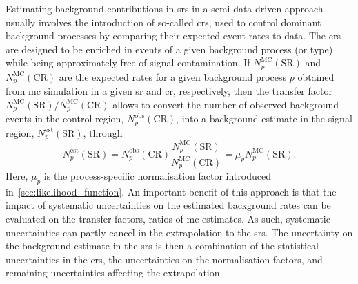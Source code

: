 Estimating background contributions in \glspl{sr} in a semi-data-driven approach usually involves the introduction of so-called \glspl{cr}, used to control dominant background processes by comparing their expected event rates to data.
The \glspl{cr} are designed to be enriched in events of a given background process (or type) while being approximately free of signal contamination.
If $N_p^\mathrm{MC}(\mathrm{SR})$ and $N_p^\mathrm{MC}(\mathrm{CR})$ are the expected rates for a given background process $p$ obtained from \gls{mc} simulation in a given \gls{sr} and \gls{cr}, respectively, then the transfer factor $N_p^\mathrm{MC}(\mathrm{SR})/N_p^\mathrm{MC}(\mathrm{CR})$ allows to convert the number of observed background events in the control region, $N_p^\mathrm{obs}(\mathrm{CR})$, into a background estimate in the signal region, $N_p^\mathrm{est}(\mathrm{SR})$, through
\begin{equation}
	N_p^\mathrm{est}(\mathrm{SR}) = N_p^\mathrm{obs}(\mathrm{CR}) \frac{N_p^\mathrm{MC}(\mathrm{SR})}{N_p^\mathrm{MC}(\mathrm{CR})} = \mu_p N_p^\mathrm{MC}(\mathrm{SR}).
	\label{eq:transfer_factor}
\end{equation}
Here, $\mu_p$ is the process-specific normalisation factor introduced in~\cref{sec:likelihood_function}.
An important benefit of this approach is that the impact of systematic uncertainties on the estimated background rates can be evaluated on the transfer factors, \ie ratios of \gls{mc} estimates.
As such, systematic uncertainties can partly cancel in the extrapolation to the \glspl{sr}.
The uncertainty on the background estimate in the \glspl{sr} is then a combination of the statistical uncertainties in the \glspl{cr}, the uncertainties on the normalisation factors, and remaining uncertainties affecting the extrapolation~\cite{HistFitter:2014wma}.

